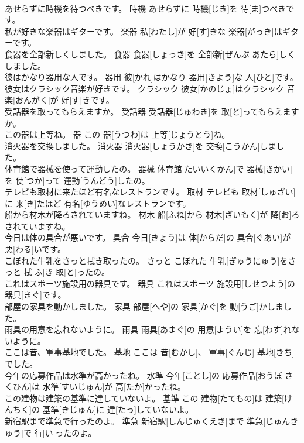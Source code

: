 \documentclass[8pt]{extreport}
\begin{document}
\begin{CJK}{UTF8}{min}
\\	あせらずに時機を待つべきです。	時機	あせらずに 時機[じき]を 待[ま]つべきです。	
\\	私が好きな楽器はギターです。	楽器	私[わたし]が 好[す]きな 楽器[がっき]はギターです。	
\\	食器を全部新しくしました。	食器	食器[しょっき]を 全部新[ぜんぶ あたら]しくしました。	
\\	彼はかなり器用な人です。	器用	彼[かれ]はかなり 器用[きよう]な 人[ひと]です。	
\\	彼女はクラシック音楽が好きです。	クラシック	彼女[かのじょ]はクラシック 音楽[おんがく]が 好[す]きです。	
\\	受話器を取ってもらえますか。	受話器	受話器[じゅわき]を 取[と]ってもらえますか。	
\\	この器は上等ね。	器	この 器[うつわ]は 上等[じょうとう]ね。	
\\	消火器を交換しました。	消火器	消火器[しょうかき]を 交換[こうかん]しました。	
\\	体育館で器械を使って運動したの。	器械	体育館[たいいくかん]で 器械[きかい]を 使[つか]って 運動[うんどう]したの。	
\\	テレビも取材に来たほど有名なレストランです。	取材	テレビも 取材[しゅざい]に 来[き]たほど 有名[ゆうめい]なレストランです。	
\\	船から材木が降ろされていますね。	材木	船[ふね]から 材木[ざいもく]が 降[お]ろされていますね。	
\\	今日は体の具合が悪いです。	具合	今日[きょう]は 体[からだ]の 具合[ぐあい]が 悪[わる]いです。	
\\	こぼれた牛乳をさっと拭き取ったの。	さっと	こぼれた 牛乳[ぎゅうにゅう]をさっと 拭[ふ]き 取[と]ったの。	
\\	これはスポーツ施設用の器具です。	器具	これはスポーツ 施設用[しせつよう]の 器具[きぐ]です。	
\\	部屋の家具を動かしました。	家具	部屋[へや]の 家具[かぐ]を 動[うご]かしました。	
\\	雨具の用意を忘れないように。	雨具	雨具[あまぐ]の 用意[ようい]を 忘[わす]れないように。	
\\	ここは昔、軍事基地でした。	基地	ここは 昔[むかし]、 軍事[ぐんじ] 基地[きち]でした。	
\\	今年の応募作品は水準が高かったね。	水準	今年[ことし]の 応募作品[おうぼ さくひん]は 水準[すいじゅん]が 高[たか]かったね。	
\\	この建物は建築の基準に達していないよ。	基準	この 建物[たてもの]は 建築[けんちく]の 基準[きじゅん]に 達[たっ]していないよ。	
\\	新宿駅まで準急で行ったのよ。	準急	新宿駅[しんじゅくえき]まで 準急[じゅんきゅう]で 行[い]ったのよ。	

\end{CJK}
\end{document}
